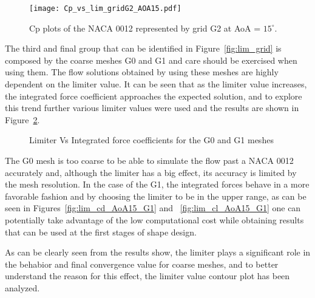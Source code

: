 \begin{figure}[]
  \centering
    \texttt{[image: Cp\_vs\_lim\_gridG2\_AOA15.pdf]}
    \caption{Cp plots of the NACA 0012 represented by grid G2 at AoA = $15^\circ$.}
    \label{fig:cp_vs_lim}
\end{figure}

The third and final group that can be identified in Figure~\ref{fig:lim_grid} is composed by the coarse meshes G0 and G1 and care should be exercised when using them. The flow solutions obtained by using these meshes are highly dependent on the limiter value. It can be seen that as the limiter value increases, the integrated force coefficient approaches the expected solution, and to explore this trend further various limiter values were used and the results are shown in Figure~\ref{fig:limiter_exp}.

\begin{figure}[]
  \begin{subfigmatrix}{2}
    \label{fig:lim_cd_AoA15_G0}
    \label{fig:lim_cl_AoA15_G0}
  \end{subfigmatrix}
  \begin{subfigmatrix}{2}
    \label{fig:lim_cd_AoA15_G1}
    \label{fig:lim_cl_AoA15_G1}
  \end{subfigmatrix}
  
  \caption{Limiter Vs Integrated force coefficients for the G0 and G1 meshes}
  \label{fig:limiter_exp}
\end{figure}

The G0 mesh is too coarse to be able to simulate the flow past a NACA 0012 accurately and, although the limiter has a big effect, its accuracy is limited by the mesh resolution. In the case of the G1, the integrated forces behave in a more favorable fashion and by choosing the limiter to be in the upper range, as can be seen in Figures~\ref{fig:lim_cd_AoA15_G1} and ~\ref{fig:lim_cl_AoA15_G1} one can potentially take advantage of the low computational cost while obtaining results that can be used at the first stages of shape design.

As can be clearly seen from the results show, the limiter plays a significant role in the behabior and final convergence value for coarse meshes, and to better understand the reason for this effect, the limiter value contour plot has been analyzed. 

